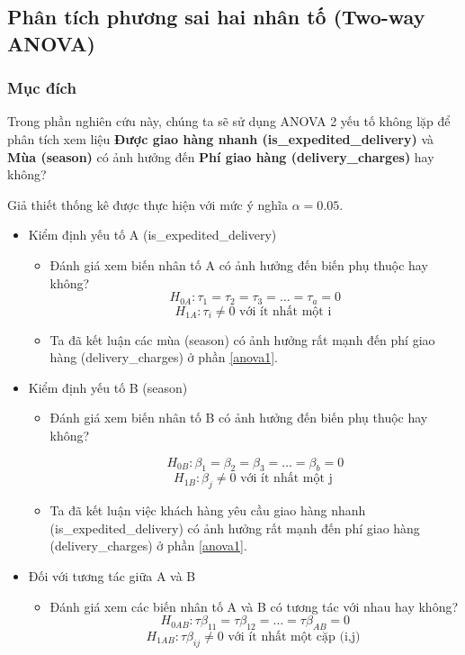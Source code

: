 
\subsection{Phân tích phương sai hai nhân tố (Two-way ANOVA)}
\subsubsection{Mục đích}
Trong phần nghiên cứu này, chúng ta sẽ sử dụng ANOVA 2 yếu tố không lặp để phân tích xem liệu \textbf{Được giao hàng nhanh (is\_expedited\_delivery)} và \textbf{Mùa (season)} có ảnh hưởng đến \textbf{Phí giao hàng (delivery\_charges)} hay không?

Giả thiết thống kê được thực hiện với mức ý nghĩa $\alpha = 0.05$.
\begin{itemize}
    \item Kiểm định yếu tố A (is\_expedited\_delivery)
    \begin{itemize}
        \item Đánh giá xem biến nhân tố A có ảnh hưởng đến biến phụ thuộc hay không?
        \[
            H_{0A}: \tau_{1} = \tau_{2} = \tau_{3} = \dots = \tau_{a} = 0
        \]
        \[
            H_{1A}: \tau_{i} \neq  0 \text{ với ít nhất một i }
        \]
        \item Ta đã kết luận các mùa (season) có ảnh hưởng rất mạnh đến phí giao hàng (delivery\_charges) ở phần \ref{anova1}.
    \end{itemize}
    
    \item Kiểm định yếu tố B (season)
    \begin{itemize}
        \item Đánh giá xem biến nhân tố B có ảnh hưởng đến biến phụ thuộc hay không?
        
        \[
            H_{0B}: \beta_{1} = \beta_{2} = \beta_{3} = \dots = \beta_{b} = 0
        \]
        \[
            H_{1B}: \beta_{j} \neq  0 \text{ với ít nhất một j }
        \]
        \item Ta đã kết luận việc khách hàng yêu cầu giao hàng nhanh (is\_expedited\_delivery) có ảnh hưởng rất mạnh đến phí giao hàng (delivery\_charges) ở phần \ref{anova1}.
    \end{itemize}
    \item Đối với tương tác giữa A và B  
    \begin{itemize}
        \item Đánh giá xem các biến nhân tố A và B có tương tác với nhau hay không?
        \[
            H_{0AB}: \tau\beta_{11} = \tau\beta_{12}  = \dots = \tau\beta_{AB} = 0 
        \]
        \[
            H_{1AB}: \tau\beta_{ij} \neq  0 \text{ với ít nhất một cặp (i,j) }
        \]
    \end{itemize}
\end{itemize}
